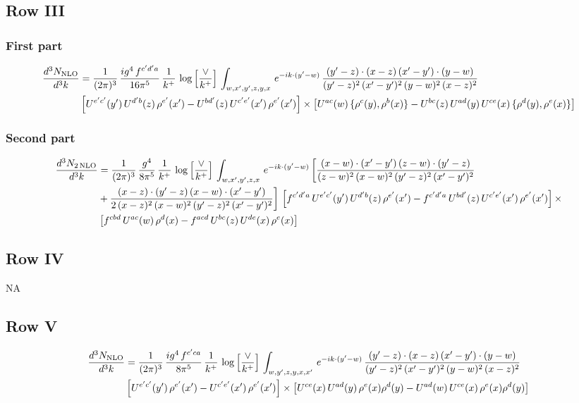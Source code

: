 \documentclass[9pt]{article}
\numberwithin{equation}{section}
\begin{document}
 \subsection{Row III}
 \subsubsection{First part}
\begin{align}
\frac{d^{3}N_{\rm NLO}}{d^{3}k} & = \frac{1}{(2\pi)^{3}}\, \frac{ig^{4}\,f^{c'd'a}}{16\pi^{5}}\, \frac{1}{k^{+}}\,\log{\left[\frac{\vee}{k^{+}}\right]}\,\int_{w,x',y',z,y,x}\, e^{-ik\cdot (y'-w)}\,\frac{(y'-z)\cdot (x-z)\,(x'-y')\cdot (y-w)}{(y'-z)^{2}\,(x'-y')^{2}\,(y-w)^{2}\,(x-z)^{2}}\notag \\
& \left[U^{e'c'}(y')\,U^{d'b}(z)\,\rho^{e'}(x')-U^{bd'}(z)\,U^{c'e'}(x')\,\rho^{e'}(x')\right]\times \left[U^{ac}(w)\, \{\rho^{c}(y),\rho^{b}(x)\}-U^{bc}(z)\,U^{ad}(y)\,U^{ce}(x)\,\{\rho^{d}(y),\rho^{e}(x)\}\right]
\end{align}
\subsubsection{Second part}
\begin{align}
\frac{d^{3}N_{2\,\rm NLO}}{d^{3}k} & = \frac{1}{(2\pi)^{3}}\,\frac{g^{4}}{8\pi^{5}}\,\frac{1}{k^{+}}\,\log{\left[\frac{\vee}{k^{+}}\right]}\,\int_{w,x',y',z,x}\, e^{-ik\cdot (y'-w)}\,\bigg[\frac{(x-w)\cdot (x'-y')\,(z-w)\cdot (y'-z)}{(z-w)^{2}\,(x-w)^{2}\,(y'-z)^{2}\,(x'-y')^{2}}\notag \\
& +\frac{(x-z)\cdot (y'-z)\,(x-w)\cdot (x'-y')}{2\,(x-z)^{2}\,(x-w)^{2}\,(y'-z)^{2}\,(x'-y')^{2}}\bigg]\, \left[f^{c'd'a}\,U^{e'c'}(y')\,U^{d'b}(z)\,\rho^{e'}(x')-f^{c'd'a}\, U^{bd'}(z)\,U^{c'e'}(x')\,\rho^{e'}(x')\right]\times\notag \\
& \left[f^{cbd}\,U^{ac}(w)\,\rho^{d}(x) -f^{acd}\,U^{bc}(z)\,U^{de}(x)\,\rho^{e}(x)\right]
\end{align}
\subsection{Row IV}
\textsc{NA}
\subsection{Row V}
\begin{align}
\frac{d^{3}N_{\rm NLO}}{d^{3}k} & = \frac{1}{(2\pi)^{3}}\, \frac{ig^{4}\,f^{c'ca}}{8\pi^{5}}\, \frac{1}{k^{+}}\,\log{\left[\frac{\vee}{k^{+}}\right]}\,\int_{w,y',z,y,x,x'}\, e^{-ik\cdot (y'-w)}\,\frac{(y'-z)\cdot (x-z)\,(x'-y')\cdot (y-w)}{(y'-z)^{2}\,(x'-y')^{2}\,(y-w)^{2}\,(x-z)^{2}}\notag \\
& \left[U^{e'c'}(y')\,\rho^{e'}(x')-U^{c'e'}(x')\,\rho^{e'}(x')\right]\times \left[U^{ce}(x)\,U^{ad}(y)\,\rho^{e}(x)\rho^{d}(y)-U^{ad}(w)\,U^{ce}(x)\,\rho^{e}(x)\rho^{d}(y)\right]
\end{align}
\end{document}
